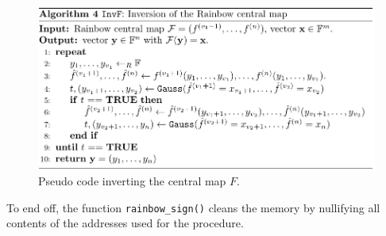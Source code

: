 \begin{figure}[t]
    \centering
    \includegraphics[width=\textwidth]{resources/rainbowinvf.png}
    \caption{Pseudo code inverting the central map $F$.}
    \label{rainbowinvf}
\end{figure}
To end off, the function \texttt{rainbow\_sign()} cleans the memory by nullifying all contents of the addresses used for the procedure.

